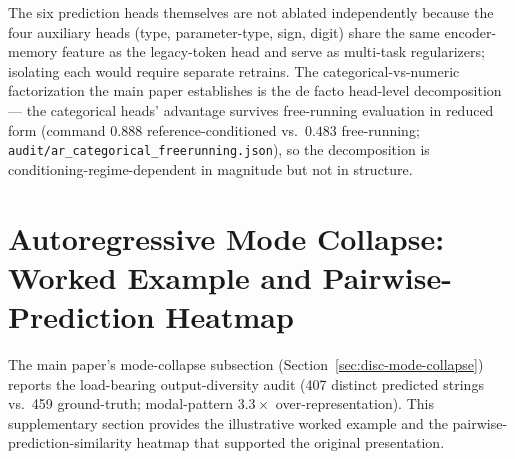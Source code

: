\documentclass[11pt,a4paper]{article}
\begin{document}
The six prediction heads themselves are not ablated independently because the four auxiliary heads (type, parameter-type, sign, digit) share the same encoder-memory feature as the legacy-token head and serve as multi-task regularizers; isolating each would require separate retrains. The categorical-vs-numeric factorization the main paper establishes is the de facto head-level decomposition --- the categorical heads' advantage survives free-running evaluation in reduced form (command $0.888$ reference-conditioned vs.\ $0.483$ free-running; \texttt{audit/ar\_categorical\_freerunning.json}), so the decomposition is conditioning-regime-dependent in magnitude but not in structure.

\section{Autoregressive Mode Collapse: Worked Example and Pairwise-Prediction Heatmap}
\label{sec:disc-mode-collapse-worked}

The main paper's mode-collapse subsection (Section~\ref{sec:disc-mode-collapse}) reports the load-bearing output-diversity audit (407 distinct predicted strings vs.\ 459 ground-truth; modal-pattern $3.3\times$ over-representation). This supplementary section provides the illustrative worked example and the pairwise-prediction-similarity heatmap that supported the original presentation.
\end{document}
